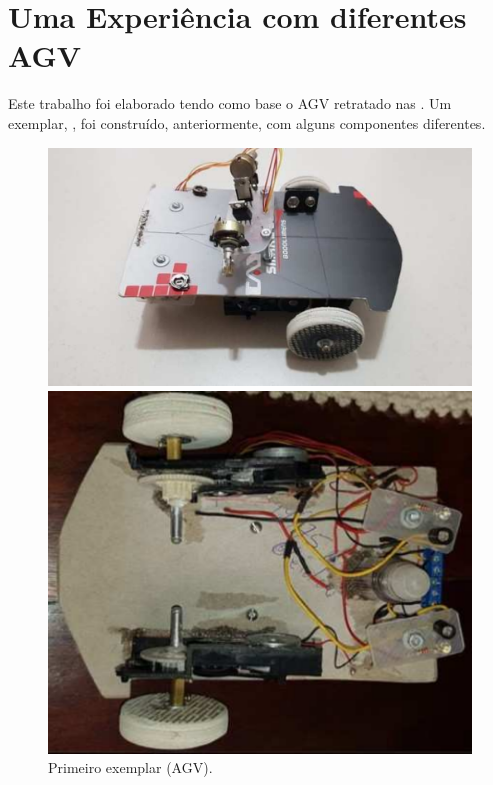 \documentclass{textolivre}
\begin{document}
\section{Uma Experiência com diferentes AGV}\label{sec-experiencia}

Este trabalho foi elaborado tendo como base o AGV retratado nas
. Um exemplar, , foi construído, anteriormente,
com alguns componentes diferentes.

\begin{figure}[h!]
\begin{minipage}{0.47\textwidth}
\includegraphics[width=\linewidth]{figure-36.pdf}
\subcaption{}
\end{minipage}
\hfill
\begin{minipage}{0.47\textwidth}
\includegraphics[width=\linewidth]{figure-37.pdf}
\subcaption{}
\end{minipage}
\caption{Primeiro exemplar (AGV).}
\label{fig26}
\end{figure}
\end{document}
